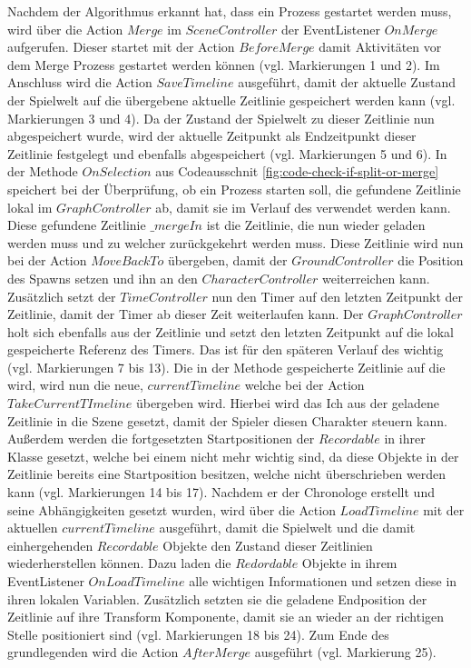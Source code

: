 Nachdem der Algorithmus erkannt hat, dass ein  Prozess gestartet werden muss, wird über die Action $Merge$ im $SceneController$ der EventListener $OnMerge$ aufgerufen. Dieser startet mit der Action $BeforeMerge$ damit Aktivitäten vor dem Merge Prozess gestartet werden können (vgl. Markierungen 1 und 2). Im Anschluss wird die Action $SaveTimeline$ ausgeführt, damit der aktuelle Zustand der Spielwelt auf die übergebene aktuelle Zeitlinie gespeichert werden kann (vgl. Markierungen 3 und 4). Da der Zustand der Spielwelt zu dieser Zeitlinie nun abgespeichert wurde, wird der aktuelle Zeitpunkt als Endzeitpunkt dieser Zeitlinie festgelegt und ebenfalls abgespeichert (vgl. Markierungen 5 und 6). In der Methode $OnSelection$ aus Codeausschnit \ref{fig:code-check-if-split-or-merge} speichert bei der Überprüfung, ob ein  Prozess starten soll, die gefundene Zeitlinie lokal im $GraphController$ ab, damit sie im Verlauf des  verwendet werden kann. Diese gefundene Zeitlinie $\_mergeIn$ ist die Zeitlinie, die nun wieder geladen werden muss und zu welcher zurückgekehrt werden muss. Diese Zeitlinie wird nun bei der Action $MoveBackTo$ übergeben, damit der $GroundController$ die Position des Spawns setzen und ihn an den $CharacterController$ weiterreichen kann. Zusätzlich setzt der $TimeController$ nun den Timer auf den letzten Zeitpunkt der Zeitlinie, damit der Timer ab dieser Zeit weiterlaufen kann. Der $GraphController$ holt sich ebenfalls aus der Zeitlinie und setzt den letzten Zeitpunkt auf die lokal gespeicherte Referenz des Timers. Das ist für den späteren Verlauf des  wichtig (vgl. Markierungen 7 bis 13). Die in der Methode gespeicherte Zeitlinie auf die  wird, wird nun die neue, $currentTimeline$ welche bei der Action $TakeCurrentTImeline$ übergeben wird. Hierbei wird das Ich aus der geladene Zeitlinie in die Szene gesetzt, damit der Spieler diesen Charakter steuern kann. Außerdem werden die fortgesetzten Startpositionen der $Recordable$ in ihrer Klasse gesetzt, welche bei einem  nicht mehr wichtig sind, da diese Objekte in der Zeitlinie bereits eine Startposition besitzen, welche nicht überschrieben werden kann (vgl. Markierungen 14 bis 17). Nachdem er der Chronologe erstellt und seine Abhängigkeiten gesetzt wurden, wird über die Action $LoadTimeline$ mit der aktuellen $currentTimeline$ ausgeführt, damit die Spielwelt und die damit einhergehenden $Recordable$ Objekte den Zustand dieser Zeitlinien wiederherstellen können. Dazu laden die $Redordable$ Objekte in ihrem EventListener $OnLoadTimeline$ alle wichtigen Informationen und setzen diese in ihren lokalen Variablen. Zusätzlich setzten sie die geladene Endposition der Zeitlinie auf ihre Transform Komponente, damit sie an wieder an der richtigen Stelle positioniert sind (vgl. Markierungen 18 bis 24). Zum Ende des grundlegenden  wird die Action $AfterMerge$ ausgeführt (vgl. Markierung 25).

